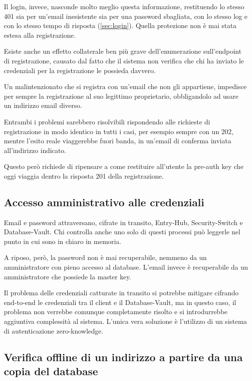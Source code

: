 Il login, invece, nasconde molto meglio questa informazione, restituendo lo stesso 401 sia per un'email
inesistente sia per una password sbagliata, con lo stesso log e con lo stesso tempo di risposta
(\autoref{sec:login}). Quella protezione non è mai stata estesa alla registrazione.

Esiste anche un effetto collaterale ben più grave dell'enumerazione sull'endpoint di registrazione, causato 
dal fatto che il sistema non verifica che chi ha inviato le credenziali per la registrazione le possieda 
davvero. 

Un malintenzionato che si registra con un'email che non gli appartiene, impedisce per sempre la registrazione
al suo legittimo proprietario, obbligandolo ad usare un indirizzo email diverso. 

Entrambi i problemi sarebbero risolvibili rispondendo alle richieste di registrazione in modo identico in
tutti i casi, per esempio sempre con un 202, mentre l'esito reale viaggerebbe fuori banda, in un'email di
conferma inviata all'indirizzo indicato.

Questo però richiede di ripensare a come restituire all'utente la pre-auth key che oggi viaggia dentro la 
risposta 201 della registrazione. 

\subsection{Accesso amministrativo alle credenziali}
\label{sec:accesso-credenziali}

Email e password attraversano, cifrate in transito, Entry-Hub, Security-Switch e Database-Vault.
Chi controlla anche uno solo di questi processi può leggerle nel punto in cui sono in chiaro in memoria. 

A riposo, però, la password non è mai recuperabile, nemmeno da un amministratore con pieno
accesso al database. L'email invece è recuperabile da un amministratore che possiede la master key.

Il problema delle credenziali catturate in transito si potrebbe mitigare cifrando end-to-end le credenziali 
tra il client e il Database-Vault, ma in questo caso, il problema non verrebbe comunque completamente 
risolto e si introdurrebbe aggiuntiva complessità al sistema. L'unica vera soluzione è l'utilizzo di un sistema
di autenticazione zero-knowledge.

\subsection{Verifica offline di un indirizzo a partire da una copia del database}

